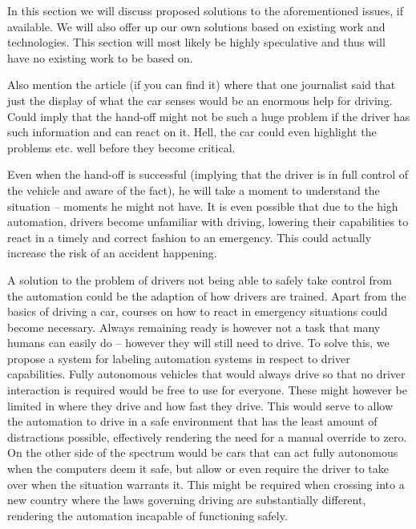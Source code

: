 \documentclass{acm_proc_article-sp}
\begin{document}


In this section we will discuss proposed solutions to the aforementioned issues, if available.
We will also offer up our own solutions based on existing work and technologies.
This section will most likely be highly speculative and thus will have no existing work to be based on.

Also mention the article (if you can find it) where that one journalist said that just the display of what the car senses would be an enormous help for driving.
Could imply that the hand-off might not be such a huge problem if the driver has such information and can react on it.
Hell, the car could even highlight the problems etc. well before they become critical.

Even when the hand-off is successful (implying that the driver is in full control of the vehicle and aware of the fact), he will take a moment to understand the situation – moments he might not have.
It is even possible that due to the high automation, drivers become unfamiliar with driving, lowering their capabilities to react in a timely and correct fashion to an emergency.
This could actually increase the risk of an accident happening.

A solution to the problem of drivers not being able to safely take control from the automation could be the adaption of how drivers are trained.
Apart from the basics of driving a car, courses on how to react in emergency situations could become necessary.
Always remaining ready is however not a task that many humans can easily do – however they will still need to drive.
To solve this, we propose a system for labeling automation systems in respect to driver capabilities.
Fully autonomous vehicles that would always drive so that no driver interaction is required would be free to use for everyone.
These might however be limited in where they drive and how fast they drive.
This would serve to allow the automation to drive in a safe environment that has the least amount of distractions possible, effectively rendering the need for a manual override to zero.
On the other side of the spectrum would be cars that can act fully autonomous when the computers deem it safe, but allow or even require the driver to take over when the situation warrants it.
This might be required when crossing into a new country where the laws governing driving are substantially different, rendering the automation incapable of functioning safely.
\end{document}

